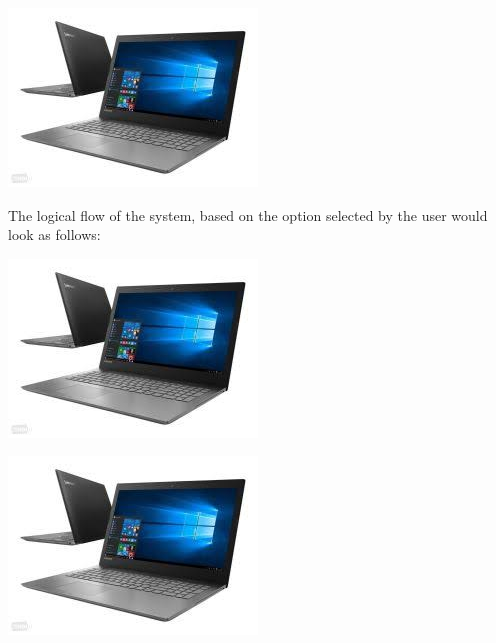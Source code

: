 \documentclass[paper=a4, fontsize=11pt]{scrartcl}
\numberwithin{equation}{section}		%
\numberwithin{figure}{section}			%
\numberwithin{table}{section}				%
\begin{document}
\includegraphics[width = \textwidth]{img.jpeg}

\newpage
The logical flow of the system, based on the option selected by the user would look as follows:

\includegraphics[width = \textwidth]{img.jpeg}

\newpage

\includegraphics[width = \textwidth]{img.jpeg}
\end{document}
